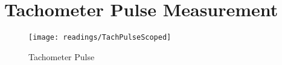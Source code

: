 \chapter{Tachometer Pulse Measurement}
\begin{figure}[h]
  \texttt{[image: readings/TachPulseScoped]}
  \centering
  \caption{Tachometer Pulse}
  \label{fig:tach_pulse_scoped}
\end{figure}

